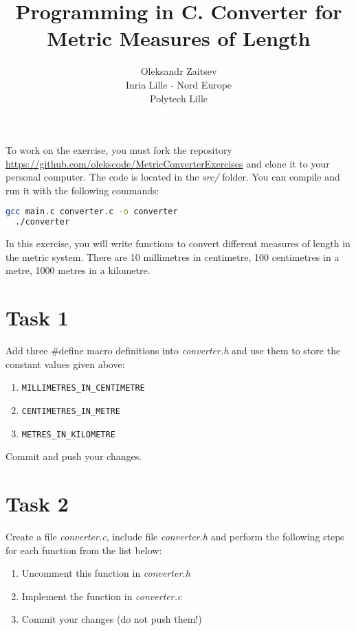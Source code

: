 \documentclass[a4paper,11pt]{article}
\begin{document}
\title{Programming in C. Converter for Metric Measures of Length}
\author{Oleksandr Zaitsev\\ Inria Lille - Nord Europe\\ Polytech Lille}
\date{}
\maketitle

To work on the exercise, you must fork the repository \url{https://github.com/olekscode/MetricConverterExercises} and clone it to your personal computer. The code is located in the \emph{src/} folder. You can compile and run it with the following commands:

\begin{lstlisting}[language=Bash]
  gcc main.c converter.c -o converter
  ./converter
\end{lstlisting}

In this exercise, you will write functions to convert different measures of length in the metric system. There are 10 millimetres in centimetre, 100 centimetres in a metre, 1000 metres in a kilometre.

\section*{Task 1}

Add three \#define macro definitions into \emph{converter.h} and use them to store the constant values given above:

\begin{enumerate}
\item \lstinline{MILLIMETRES_IN_CENTIMETRE}
\item \lstinline{CENTIMETRES_IN_METRE}
\item \lstinline{METRES_IN_KILOMETRE}
\end{enumerate}

Commit and push your changes.

\section*{Task 2}

Create a file \emph{converter.c}, include file \emph{converter.h} and perform the following steps for each function from the list below:

\begin{enumerate}
\item Uncomment this function in \emph{converter.h}
\item Implement the function in \emph{converter.c}
\item Commit your changes (do not push them!)
\end{enumerate}
\end{document}
